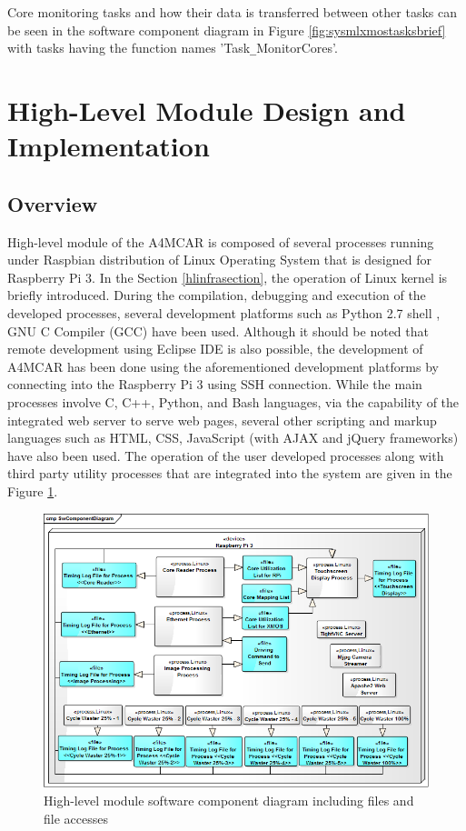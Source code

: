 Core monitoring tasks and how their data is transferred between other tasks can be seen in the software component diagram in Figure \ref{fig:sysmlxmostasksbrief} with tasks having the function names 'Task\texttt{\_}MonitorCores'.

\section{High-Level Module Design and Implementation}
\subsection{Overview}
High-level module of the A4MCAR is composed of several processes running under Raspbian \cite{raspbiandownload} distribution of Linux Operating System that is designed for Raspberry Pi 3. In the Section \ref{hlinfrasection}, the operation of Linux kernel is briefly introduced. During the compilation, debugging and execution of the developed processes, several development platforms such as Python 2.7 shell \cite{python27}, GNU C Compiler (GCC) \cite{gcc} have been used. Although it should be noted that remote development using Eclipse IDE \cite{remotedebuggingeclipse} is also possible, the development of A4MCAR has been done using the aforementioned development platforms by connecting into the Raspberry Pi 3 using SSH connection. While the main processes involve C, C++, Python, and Bash \cite{bash} languages, via the capability of the integrated web server to serve web pages, several other scripting and markup languages such as HTML, CSS, JavaScript (with AJAX \cite{howajaxworks} and jQuery \cite{jquery} frameworks) have also been used. The operation of the user developed processes along with third party utility processes that are integrated into the system are given in the Figure \ref{fig:rpicomponents}. 
\begin{figure}[!ht]
	\centering
	\captionsetup{justification=centering}
	\includegraphics[width=\textwidth]{content/images/rpicomponents.png}
	\caption{High-level module software component diagram including files and file accesses}
	\label{fig:rpicomponents}
\end{figure}

